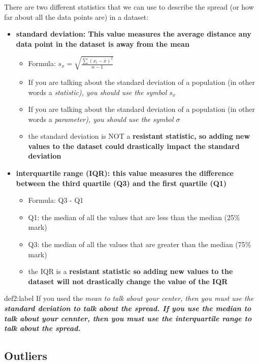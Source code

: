 There are two different statistics that we can use to describe the spread (or how far about all the data points are) in a dataset:

\begin{itemize}
    \item \bf{standard deviation:} This value measures the average distance any data point in the dataset is away from the mean
    \begin{itemize}
        \item Formula: $s_x = \sqrt{\frac{\sum (x_i - \bar{x})^2}{n-1}}$
        \item If you are talking about the standard deviation of a population (in other words a \it{statistic}), you should use the symbol $s_x$
        \item If you are talking about the standard deviation of a population (in other words a \it{parameter}), you should use the symbol $\sigma$
        \item the standard deviation is NOT a \bf{resistant statistic}, so adding new values to the dataset could drastically impact the standard deviation
    \end{itemize}

    \item \bf{interquartile range (IQR):} this value measures the difference between the third quartile (Q3) and the first quartile (Q1)
    \begin{itemize}
        \item Formula: Q3 - Q1
        \item Q1: the median of all the values that are less than the median (25\% mark)
        \item Q3: the median of all the values that are greater than the median (75\% mark)
        \item the IQR is a \bf{resistant statistic} so adding new values to the dataset will not drastically change the value of the IQR
    \end{itemize}
\end{itemize}

\begin{definition}{def2:label}
    If you used the \it{mean} to talk about your center, then you must use the \bf{standard deviation} to talk about the spread. If you use the \it{median} to talk about your cennter, then you must use the \bf{interquartile range} to talk about the spread.
\end{definition}


\subsection{Outliers}

